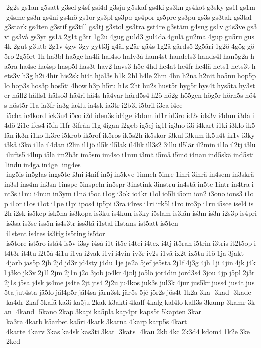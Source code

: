  2g2s gs1an g5satt g3sel g4sf gsi4d g3sju g5skaf gs4ki gs3kn gs4kot g3sky gs1l gs1m g4sme gs3n gs4ni gs4nö gs1or gs3pl gs3po gs4por gs5pre gs3pu gs3s gs3tak gs3tal g3stark gs4ten g3stif gs3till gs3tj g3stol gs3tra gst4re g3stäm g4sug gs1v g4s3ve gs3vi gs3vå gs3yt gs1ä 2g1t g3tr 1g2u 4gug guld3 gul4da 4gulä gu2ma 4gup gu5ru gus4k 2gut g3utb 2g1v 4gw 3gy gytt3j g4äl g2är gä4s 1g2å gårds5 2g5åri 1g2ö 4gög gö5ro 2g5ört 1h ha3bl ha5ge ha4li hal4so halv3å ham4st handels3 hands4l han5g2a ha5ra ha4sc ha4sp hasp5l has3t hav2 havs3 h5c 4hd he4at he4fr he4lä hets1 hets3t hets3v h3g h2i 4hir his2sk hi4t hjäl3s h1k 2hl h4le 2hm 4hn h2na h2nit ho5nu hop5plo hop3s hos3p hos5ti 4how h3p h5ru h1s 2ht hu2s hust5r hyg5r hys4t hys5ta hy3ster häll2 hälls1 hälso3 hä4ri hä4s hä4var hård5s4 h2ö hö2g hö5gen hög5r hörn5s hö4s höst5r i1a ia3fr ia3g ia4lu ia4sk ia3tr i2b3l i5bril i3ca i4ce  i5cha ic4kord ick3u4 i5co i2d iden3s id4ge i4dom id1r id3ro id2s ids3v i4dun i3då i4dö 2i1e ifes4 i5fn i1fr 3ifrån i1g 4igan i2geb ig5ej ig1l ig3no i3i i4kart i1ki i3klo ik5län ik3n i1ko ik3re i5krob ik5rof ik5ros ik5s2h ik5skor i3kul i3kum ik5u4t ik1v i3ky i3kå i3kö i1la il4dan i2lin il1jö il5k il5lak il4lik ill3s2 3illu il5lär il2min i1lo il2tj i3lu ilufts5 i4lup i5lä im2b3r im5sm im4so i1mu i3mä i5må i5mö i4nau ind5skä ind5sti 1indu in4ga in4ge  ing4es  ing5is in5glas ings5te i3ni i4nif in5j in5kve 1inneh 5inre 1inri 3inrä in4sem in3skrä in3sl ins4m in3sn 1inspe 5inspeln in5spr 3instink 3instru in4stå in5te 1intr in4tra int3s i1nu i4nun in3ym i1nä i5oc i1og i3ok io4kr i1ol io5li i5om ion2 i3ono ions3 i1op i1or i1os i1ot i1pe i1pi ipos4 ip5pi i3ra i4res i1ri irk5l i1ro iro3p i1ru i5sce isel4 is2h i2sk is5kep isk5na is3kopa is3ku is4kun is3ky i5slam is3län is3m is3n i2s3p is4pri is3sa is3se iss5n is4s3tr iss3tä i1stal i1stans ist5att is5ten  i1stent is4tes is3tig is5ting is5tor  is5tore ist5ro istå4 is5v i3sy i4så i1t it5c i4tei i4tex i4tj it5ran i5trin i3tris it2t5op it4t3r it4tu i2t5å 4i1u i1va i2vak i1vi i4vin iv3r iv2s i1vå ix2t ix5tu i1ö 1ja 3jakt  4jarb jas5p 2jb 2jd jd3r jd4sty j4du 1je je2a 5jef je5sta 2j1f 4j3g 4jh 1ji 4jin 4jk j4kl j3ko jk3v 2j1l 2jm 2j1n j2o 3job jo4kr 4jolj jo5lö jor4din jord3s4 3jou 4jp j5pl 2j3r 2j1s j5sa j4sk js4me js4te 2jt jts4 2j2u ju4kos juk3s jul3k 4jur jus5kr juss4 jus4t jus5ta jut4sta jä5lo jäl4p5r jäl4sa järn3sk jär5s 5jé jör2s jös4t 1k2a 3ka  3kad  3kade  ka4dr 2kaf 5kafä ka3i ka5ju 2kak k3akti 4kalf 4kalg kal4lo kall3s 3kamp 3kamr 3kan  4kand  5kano 2kap 3kapi ka5pla kap4pr kaps5t 5kapten 3kar  ka3ra 4karb k5arbet ka5ri 4kark 3karna 4karp karp5s 4kart  4karte 4karv 3kas ka4sk kas3ti 3kat  3kats  4kau 2kb 4kc 2k3d4 kdom4 1k2e 3ke  2ked 